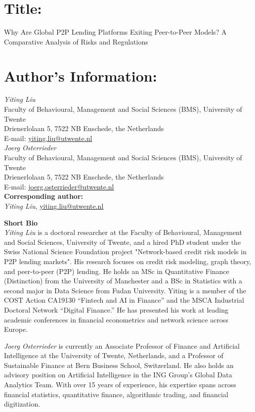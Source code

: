\documentclass{article}[a4paper]
\begin{document}
\section*{Title:}
Why Are Global P2P Lending Platforms Exiting Peer-to-Peer Models? A Comparative Analysis of Risks and Regulations

\section*{Author's Information:}
\textit{Yiting Liu}\\
Faculty of Behavioural, Management and Social Sciences (BMS), University of Twente\\
Drienerlolaan 5, 7522 NB Enschede, the Netherlands\\
E-mail: \href{mailto:}{yiting.liu@utwente.nl}\\

\textit{Joerg Osterrieder}\\
Faculty of Behavioural, Management and Social Sciences (BMS), University of Twente\\
Drienerlolaan 5, 7522 NB Enschede, the Netherlands\\
E-mail: \href{mailto:}{joerg.osterrieder@utwente.nl}\\

\textbf{Corresponding author:}\\
\textit{Yiting Liu}, \href{mailto:}{yiting.liu@utwente.nl}

\textbf{Short Bio}\\
\emph{Yiting Liu} is a doctoral researcher at the Faculty of Behavioural, Management and Social Sciences, University of Twente, and a hired PhD student under the Swiss National Science Foundation project "Network-based credit risk models in P2P lending markets". His research focuses on credit risk modeling, graph theory, and peer-to-peer (P2P) lending. He holds an MSc in Quantitative Finance (Distinction) from the University of Manchester and a BSc in Statistics with a second major in Data Science from Fudan University. Yiting is a member of the COST Action CA19130 “Fintech and AI in Finance” and the MSCA Industrial Doctoral Network “Digital Finance.” He has presented his work at leading academic conferences in financial econometrics and network science across Europe.

\emph{Joerg Osterrieder} is currently an Associate Professor of Finance and Artificial Intelligence at the University of Twente, Netherlands, and a Professor of Sustainable Finance at Bern Business School, Switzerland. He also holds an advisory position on Artificial Intelligence in the ING Group's Global Data Analytics Team. With over 15 years of experience, his expertise spans across financial statistics, quantitative finance, algorithmic trading, and financial digitization.
\end{document}

